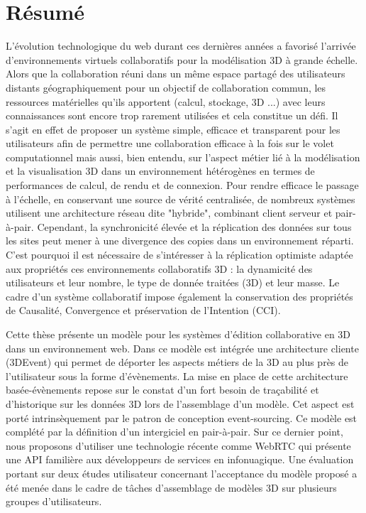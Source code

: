 \clearpage
\section*{Résumé}

L’évolution technologique du web durant ces dernières années a favorisé l’arrivée d’environnements virtuels collaboratifs pour la modélisation 3D à grande échelle. Alors que la collaboration réuni dans un même espace partagé des utilisateurs distants géographiquement pour un objectif de collaboration commun, les ressources matérielles qu'ils apportent (calcul, stockage, 3D ...) avec leurs connaissances sont encore trop rarement utilisées et cela constitue un défi. Il s'agit en effet de proposer un système simple, efficace et transparent pour les utilisateurs afin de permettre une collaboration efficace à la fois sur le volet computationnel mais aussi, bien entendu, sur l'aspect métier lié à la modélisation et la visualisation 3D dans un environnement hétérogènes en termes de performances de calcul, de rendu et de connexion.
Pour rendre efficace le passage à l’échelle, en conservant une source de vérité centralisée, de nombreux systèmes utilisent une architecture réseau dite "hybride", combinant client serveur et pair-à-pair. Cependant, la synchronicité élevée et la réplication des données sur tous les sites peut mener à une divergence des copies dans un environnement réparti. C’est pourquoi il est nécessaire de s’intéresser à la réplication optimiste adaptée aux propriétés ces environnements collaboratifs 3D : la dynamicité des utilisateurs et leur nombre, le type de donnée traitées (3D) et leur masse. Le cadre d’un système collaboratif impose également la conservation des propriétés de Causalité, Convergence et préservation de l’Intention (CCI).

Cette thèse présente un modèle pour les systèmes d’édition collaborative en 3D dans un environnement web. Dans ce modèle est intégrée une architecture cliente (3DEvent) qui permet de déporter les aspects métiers de la 3D au plus près de l’utilisateur sous la forme d’évènements. La mise en place de cette architecture basée-évènements repose sur le constat d’un fort besoin de traçabilité et d’historique sur les données 3D lors de l’assemblage d’un modèle. Cet aspect est porté intrinsèquement par le patron de conception event-sourcing. Ce modèle est complété par la définition d’un intergiciel en pair-à-pair. Sur ce dernier point, nous proposons d'utiliser une technologie récente comme WebRTC qui présente une API familière aux développeurs de services en infonuagique. Une évaluation portant sur deux études utilisateur concernant l’acceptance du modèle proposé a été menée dans le cadre de tâches d’assemblage de modèles 3D sur plusieurs groupes d’utilisateurs.

